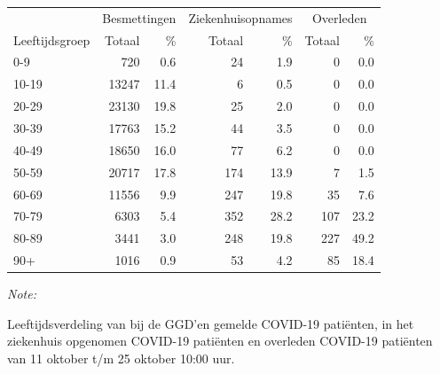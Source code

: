 \documentclass[
  english,
  man,floatsintext]{apa6}
\begin{document}
\begin{table}[H]
\centering\begingroup\fontsize{11}{13}\selectfont

\begin{threeparttable}
\begin{tabular}{lrrrrrr}
\toprule
\multicolumn{1}{c}{ } & \multicolumn{2}{c}{Besmettingen} & \multicolumn{2}{c}{Ziekenhuisopnames} & \multicolumn{2}{c}{Overleden} \\
\cmidrule(l{3pt}r{3pt}){2-3} \cmidrule(l{3pt}r{3pt}){4-5} \cmidrule(l{3pt}r{3pt}){6-7}
Leeftijdsgroep & Totaal & \% & Totaal & \% & Totaal & \%\\
\midrule
0-9 & 720 & 0.6 & 24 & 1.9 & 0 & 0.0\\
10-19 & 13247 & 11.4 & 6 & 0.5 & 0 & 0.0\\
20-29 & 23130 & 19.8 & 25 & 2.0 & 0 & 0.0\\
30-39 & 17763 & 15.2 & 44 & 3.5 & 0 & 0.0\\
40-49 & 18650 & 16.0 & 77 & 6.2 & 0 & 0.0\\
50-59 & 20717 & 17.8 & 174 & 13.9 & 7 & 1.5\\
60-69 & 11556 & 9.9 & 247 & 19.8 & 35 & 7.6\\
70-79 & 6303 & 5.4 & 352 & 28.2 & 107 & 23.2\\
80-89 & 3441 & 3.0 & 248 & 19.8 & 227 & 49.2\\
90+ & 1016 & 0.9 & 53 & 4.2 & 85 & 18.4\\
\bottomrule
\end{tabular}
\begin{tablenotes}
\item \textit{Note: } 
\item Leeftijdsverdeling van bij de GGD’en gemelde COVID-19 patiënten, in het ziekenhuis opgenomen COVID-19 patiënten en overleden COVID-19 patiënten van 11 oktober t/m 25 oktober 10:00 uur.
\end{tablenotes}
\end{threeparttable}
\endgroup{}
\end{table}
\end{document}

